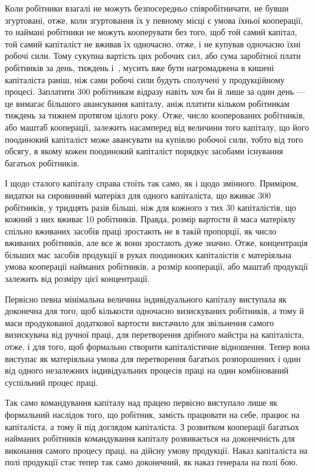 
Коли робітники взагалі не можуть безпосередньо співробітничати,
не бувши згуртовані, отже, коли згуртовання їх у певному
місці є умова їхньої кооперації, то наймані робітники не можуть
кооперувати без того, щоб той самий капітал, той самий капіталіст
не вживав їх одночасно, отже, і не купував одночасно їхні робочі
сили. Тому сукупна вартість цих робочих сил, або сума заробітної
плати робітників за день, тиждень і~, мусить вже бути нагромаджена
в кишені капіталіста раніш, ніж сами робочі сили будуть
сполучені у продукційному процесі. Заплатити 300 робітникам
відразу навіть хоч би й лише за один день — це вимагає
більшого авансування капіталу, аніж платити кільком робітникам
тиждень за тижнем протягом цілого року. Отже, число
кооперованих робітників, або маштаб кооперації, залежить насамперед
від величини того капіталу, що його поодинокий капіталіст
може авансувати на купівлю робочої сили, тобто від того обсягу,
в якому кожен поодинокий капіталіст порядкує засобами
існування багатьох робітників.

І щодо сталого капіталу справа стоїть так само, як і щодо
змінного. Приміром, видатки на сировинний матеріял для одного
капіталіста, що вживає 300 робітників, у тридцять разів більші,
ніж для кожного з тих 30 капіталістів, що кожний з них вживає
10 робітників. Правда, розмір вартости й маса матеріялу спільно
вживаних засобів праці зростають не в такій пропорції, як число
вживаних робітників, але все ж вони зростають дуже значно.
Отже, концентрація більших мас засобів продукції в руках поодиноких
капіталістів є матеріяльна умова кооперації найманих
робітників, а розмір кооперації, або маштаб продукції залежить
від розміру цієї концентрації.

Первісно певна мінімальна величина індивідуального капіталу
виступала як доконечна для того, щоб кількости одночасно
визискуваних робітників, а тому й маси продукованої додаткової
вартости вистачило для звільнення самого визискувача від ручної
праці, для перетворення дрібного майстра на капіталіста, отже,
і для того, щоб формально створити капіталістичне відношення.
Тепер вона виступає як матеріяльна умова для перетворення
багатьох розпорошених і один від одного незалежних індивідуальних
процесів праці на один комбінований суспільний процес
праці.

Так само командування капіталу над працею первісно виступало
лише як формальний наслідок того, що робітник, замість
працювати на себе, працює на капіталіста, а тому й під доглядом
капіталіста. З розвитком кооперації багатьох найманих робітників
командування капіталу розвивається на доконечність для
виконання самого процесу праці, на дійсну умову продукції.
Наказ капіталіста на полі продукції стає тепер так само доконечний,
як наказ генерала на полі бою.

